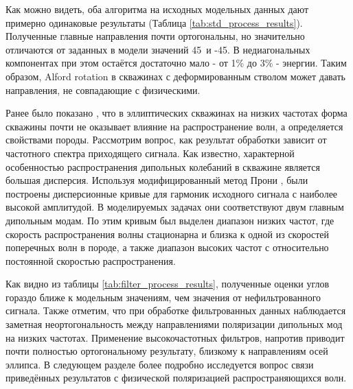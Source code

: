 \documentclass[a4paper,11pt]{article}
\begin{document}
Как можно видеть, оба алгоритма на исходных модельных данных дают примерно одинаковые результаты (Таблица \ref{tab:std_process_results}). Полученные главные направления почти ортогональны, но значительно отличаются от заданных в модели значений 45\textdegree \ и -45\textdegree. В недиагональных компонентах при этом остаётся достаточно мало - от 1\% до 3\% - энергии. Таким образом, Alford rotation в скважинах с деформированным стволом может давать направления, не совпадающие с физическими.

Ранее было показано \cite{Seroices2010}, что в эллиптических скважинах на низких частотах форма скважины почти не оказывает влияние на распространение волн, а определяется свойствами породы. Рассмотрим вопрос, как результат обработки зависит от частотного спектра приходящего сигнала. Как известно, характерной особенностью распространения дипольных колебаний в скважине является большая дисперсия. Используя модифицированный метод Прони \cite{Ekstrom1995}, были построены дисперсионные кривые для гармоник исходного сигнала с наиболее высокой амплитудой. В моделируемых задачах они соответствуют двум главным дипольным модам. %
По этим кривым был выделен диапазон низких частот, где скорость распространения волны стационарна и близка к одной из скоростей поперечных волн в породе, а также диапазон высоких частот с относительно постоянной скоростью распространения. 

Как видно из таблицы \ref{tab:filter_process_results}, полученные оценки углов гораздо ближе к модельным значениям, чем значения от нефильтрованного сигнала. Также отметим, что при обработке фильтрованных данных наблюдается заметная неортогональность между направлениями поляризации дипольных мод на низких частотах. Применение высокочастотных фильтров, напротив приводит почти полностью ортогональному результату, близкому к направлениям осей эллипса. В следующем разделе более подробно исследуется вопрос связи приведённых результатов с физической поляризацией распространяющихся волн.
\end{document}
